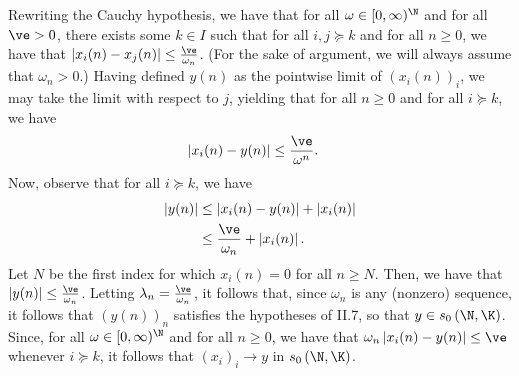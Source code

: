 \documentclass[10pt]{mypackage}
\begin{document}
\begin{solution}
  Rewriting the Cauchy hypothesis, we have that for all $\omega\in [0,\infty)^{\N}$ and for all $\ve > 0$, there exists some $k\in I$ such that for all $i,j\succeq k$ and for all $n\geq 0$, we have that $\left\vert x_{i}(n)-x_j(n) \right\vert\leq \frac{\ve}{\omega_n}$. (For the sake of argument, we will always assume that $\omega_n > 0$.) Having defined $y(n)$ as the pointwise limit of $\left( x_i(n) \right)_i$, we may take the limit with respect to $j$, yielding that for all $n\geq 0$ and for all $i\succeq k$, we have
  \begin{align*}
    \left\vert x_{i}(n)-y(n) \right\vert &\leq \frac{\ve}{\omega^{n}}.
  \end{align*}
  Now, observe that for all $i\succeq k$, we have
  \begin{align*}
    \left\vert y(n) \right\vert &\leq \left\vert x_{i}(n) - y(n)\right\vert + \left\vert x_i(n) \right\vert\\
                                &\leq \frac{\ve}{\omega_n} + \left\vert x_i(n) \right\vert.
  \end{align*}
  Let $N$ be the first index for which $x_i(n) = 0$ for all $n\geq N$. Then, we have that $\left\vert y(n) \right\vert\leq \frac{\ve}{\omega_n}$. Letting $\lambda_n = \frac{\ve}{\omega_n}$, it follows that, since $\omega_n$ is any (nonzero) sequence, it follows that $\left( y(n) \right)_n$ satisfies the hypotheses of II.7, so that $y\in s_0\left( \N,\K \right)$. Since, for all $\omega\in [0,\infty)^{\N}$ and for all $n\geq 0$, we have that $\omega_n \left\vert x_i(n)-y(n) \right\vert \leq \ve$ whenever $i\succeq k$, it follows that $\left( x_i \right)_i\rightarrow y$ in $s_0\left( \N,\K \right)$.
\end{solution}
\end{document}
